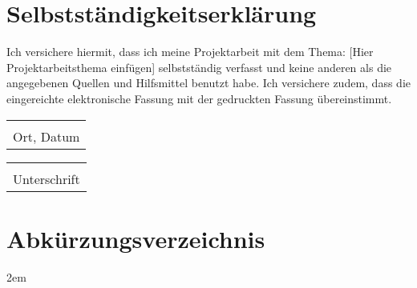 \documentclass[a4paper, 12pt]{article}
\begin{document}
\section*{Selbstständigkeitserklärung}
Ich versichere hiermit, dass ich meine Projektarbeit mit dem Thema: [Hier Projektarbeitsthema einfügen] selbstständig verfasst und keine anderen als die angegebenen Quellen und Hilfsmittel benutzt habe. 
Ich versichere zudem, dass die eingereichte elektronische Fassung mit der gedruckten Fassung übereinstimmt.

\vspace{1.25cm}
\begin{flushleft}
    \begin{minipage}[c]{0.49\textwidth}
        \begin{tabular}{@{}p{2in}@{}}
            \hrulefill \\
            Ort, Datum \\
        \end{tabular}
    \end{minipage}
    \begin{minipage}[c]{0.49\textwidth}
        \begin{tabular}{@{}p{2in}@{}}
            \hrulefill \\
            Unterschrift \\
        \end{tabular}
    \end{minipage}
\end{flushleft}

\pagebreak
\section*{Abkürzungsverzeichnis}
\begin{acronym}
\end{acronym}
\pagebreak
\tableofcontents
\pagebreak
\listoffigures
\renewcommand\listoflistingscaption{Quellcodeverzeichnis}
\listoflistings
\pagebreak

\begin{refsection}


\pagebreak
\emergencystretch 2em
\printbibliography
\pagebreak
\end{refsection}

\end{document}
